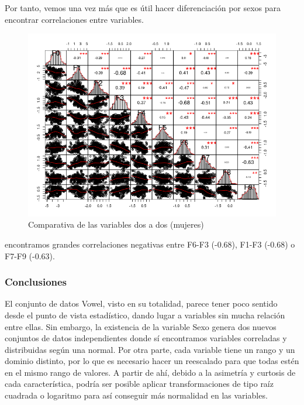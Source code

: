 Por tanto, vemos una vez más que es útil hacer diferenciación por sexos para encontrar correlaciones entre variables.

\begin{figure}[H] %
	\centering
	\includegraphics[scale=0.8]{mujeres-plot.png}  %
	\caption{Comparativa de las variables dos a dos (mujeres)} 
	\label{fig:mujeres-vowel}
\end{figure}
encontramos grandes correlaciones negativas entre F6-F3 (-0.68), F1-F3 (-0.68) o F7-F9 (-0.63).

\subsubsection{Conclusiones}

El conjunto de datos Vowel, visto en su totalidad, parece tener poco sentido desde el punto de vista estadístico, dando lugar a variables sin mucha relación entre ellas. Sin embargo, la existencia de la variable Sexo genera dos nuevos conjuntos de datos independientes donde sí encontramos variables correladas y distribuidas según una normal. Por otra parte, cada variable tiene un rango y un dominio distinto, por lo que es necesario hacer un reescalado para que todas estén en el mismo rango de valores. A partir de ahí, debido a la asimetría y curtosis de cada característica, podría ser posible aplicar transformaciones de tipo raíz cuadrada o logaritmo para así conseguir más normalidad en las variables. \\

